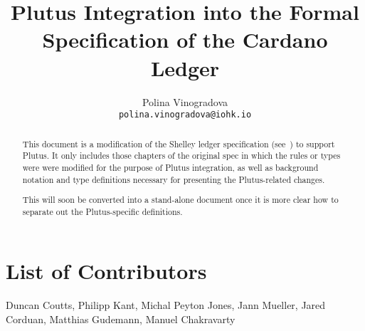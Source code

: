 
\title{Plutus Integration into the Formal Specification of the Cardano Ledger}

\author{
   Polina Vinogradova \\ {\small \texttt{polina.vinogradova@iohk.io}} \\
   }


\maketitle

\begin{abstract}
This document is a modification of the Shelley ledger specification
(see~\cite{shelley_spec}) to support Plutus.
It only includes those chapters of the original spec in which the
rules or types were were modified for the purpose of Plutus
integration, as well as background notation and type definitions necessary
for presenting the Plutus-related changes.

This will soon be converted into a stand-alone document once it is more 
clear how to separate out the Plutus-specific definitions.
\end{abstract}

\section*{List of Contributors}
\label{acknowledgements}

Duncan Coutts,
Philipp Kant,
Michal Peyton Jones,
Jann Mueller,
Jared Corduan,
Matthias Gudemann,
Manuel Chakravarty
